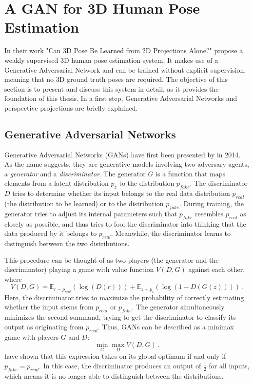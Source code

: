 \section{A GAN for 3D Human Pose Estimation}
\label{sec:network}
In their work "Can 3D Pose Be Learned from 2D Projections Alone?" \citet{drover18} propose a weakly supervised 3D human pose estimation system.
It makes use of a Generative Adversarial Network and can be trained without explicit supervision, meaning that no 3D ground truth poses are required.
The objective of this section is to present and discuss this system in detail, as it provides the foundation of this thesis.
In a first step, Generative Adversarial Networks and perspective projections are  briefly explained.

\subsection{Generative Adversarial Networks}
Generative Adversarial Networks (GANs) have first been presented by \citet{goodfellow14} in 2014.
As the name suggests, they are generative models involving two adversary agents, a \emph{generator} and a \emph{discriminator}.
The generator $G$ is a function that maps elements from a latent distribution $p_z$ to the distribution $p_{fake}$.
The discriminator $D$ tries to determine whether its input belongs to the real data distribution $p_{real}$ (the distribution to be learned) or to the distribution $p_{fake}$.
During training, the generator tries to adjust its internal parameters such that $p_{fake}$ resembles $p_{real}$ as closely as possible, and thus tries to fool the discriminator into thinking that the data produced by it belongs to $p_{real}$.
Meanwhile, the discriminator learns to distinguish between the two distributions.

This procedure can be thought of as two players (the generator and the discriminator) playing a game with value function $V(D, G)$ against each other, where
\begin{equation}
	V(D, G) = \mathbb{E}_{r\sim p_{real}}(\log(D(r))) + \mathbb{E}_{z\sim p_{z}}(\log(1 - D(G(z)))) \ .
\end{equation}
Here, the discriminator tries to maximize the probability of correctly estimating whether the input stems from $p_{real}$ or $p_{fake}$.
The generator simultaneously minimizes the second summand, trying to get the discriminator to classify its output as originating from $p_{real}$.
Thus, GANs can be described as a minimax game with players $G$ and $D$:
\begin{equation}
\min_G \max_D V(D, G) \ .
\end{equation}
\citet{goodfellow14} have shown that this expression takes on its global optimum if and only if $p_{fake} = p_{real}$.
In this case, the discriminator produces an output of $\frac{1}{2}$ for all inputs, which means it is no longer able to distinguish between the distributions.

